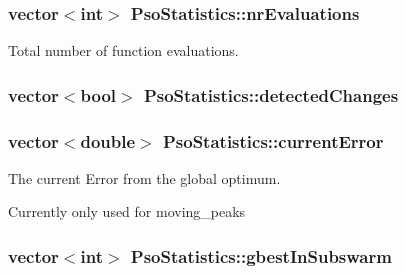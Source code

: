 \hypertarget{classPsoStatistics_de2e6696a7c404891fe80ff4c2bfcaa3}{
\subsubsection{\setlength{\rightskip}{0pt plus 5cm}vector$<$int$>$ {\bf PsoStatistics::nrEvaluations}}}
\label{classPsoStatistics_de2e6696a7c404891fe80ff4c2bfcaa3}


Total number of function evaluations. 

\hypertarget{classPsoStatistics_003f8a7beb9d9f89fb3d035d018b18a4}{
\subsubsection{\setlength{\rightskip}{0pt plus 5cm}vector$<$bool$>$ {\bf PsoStatistics::detectedChanges}}}
\label{classPsoStatistics_003f8a7beb9d9f89fb3d035d018b18a4}


\hypertarget{classPsoStatistics_7e0361a41053ac76931c909d97831487}{
\subsubsection{\setlength{\rightskip}{0pt plus 5cm}vector$<$double$>$ {\bf PsoStatistics::currentError}}}
\label{classPsoStatistics_7e0361a41053ac76931c909d97831487}


The current Error from the global optimum. 

Currently only used for moving\_\-peaks \hypertarget{classPsoStatistics_3b08f43d32d136b9cf3eac9001d7e6de}{
\subsubsection{\setlength{\rightskip}{0pt plus 5cm}vector$<$int$>$ {\bf PsoStatistics::gbestInSubswarm}}}
\label{classPsoStatistics_3b08f43d32d136b9cf3eac9001d7e6de}


